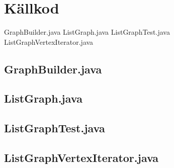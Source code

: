 \documentclass[a4paper,10pt,twoside]{article}
\begin{document}
\section{Källkod}

GraphBuilder.java
ListGraph.java
ListGraphTest.java
ListGraphVertexIterator.java


\subsection{GraphBuilder.java}


\subsection{ListGraph.java}


\subsection{ListGraphTest.java}


\subsection{ListGraphVertexIterator.java}


\end{document}

